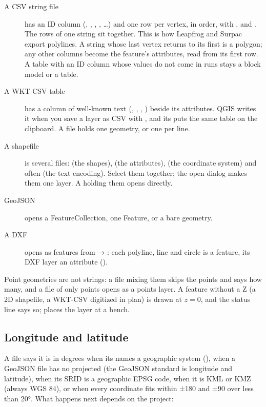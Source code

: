 \begin{description}
\item[A CSV string file] has an ID column (, , , ,
  …) and one row per vertex, in order, with ,  and . The rows of
  one string sit together. This is how Leapfrog and Surpac export polylines. A string whose last
  vertex returns to its first is a polygon; any other columns become the feature's attributes, read
  from its first row. A table with an ID column whose values do not come in runs stays a block
  model or a table.
\item[A WKT-CSV table] has a column of well-known text (, ,
  , ) beside its attributes. QGIS writes it when you save a layer as CSV
  with , and its  puts the same table on the
  clipboard. A  file holds one geometry, or one per line.
\item[A shapefile] is several files:  (the shapes),  (the attributes),
   (the coordinate system) and often  (the text encoding). Select them
  together; the open dialog makes them one layer. A  holding them opens directly.
\item[GeoJSON] opens a FeatureCollection, one Feature, or a bare geometry.
\item[A DXF] opens as features from  → : each polyline, line
  and circle is a feature, its DXF layer an attribute ().
\end{description}

Point geometries are not strings: a file mixing them skips the points and says how many, and a
file of only points opens as a points layer. A feature without a Z (a 2D shapefile, a WKT-CSV
digitized in plan) is drawn at $z=0$, and the status line says so; 
places the layer at a bench.

\subsection{Longitude and latitude}

A file says it is in degrees when its  names a geographic system (), when a
GeoJSON file has no projected  (the GeoJSON standard is longitude and latitude), when
its SRID is a geographic EPSG code, when it is KML or KMZ (always WGS 84), or when every coordinate
fits within ±180 and ±90 over less than 20°. What happens next depends on the project:

